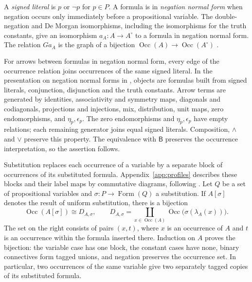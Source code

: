 \documentclass[11pt]{article}
\newcommand{\B}{\mathsf B}
\newcommand{\Occ}{\operatorname{Occ}}
\newcommand{\FormulaSet}{\operatorname{Form}}
\begin{document}
A \emph{signed literal} is $p$ or $\neg p$ for $p\in P$.
A formula is in \emph{negation normal form} when negation occurs only
immediately before a propositional variable. The double-negation and
De Morgan isomorphisms, including the isomorphisms for the truth
constants, give an isomorphism $a_A:A\to A^\circ$ to a formula in
negation normal form. The relation $Ga_A$ is the graph of a bijection
$\Occ(A)\to\Occ(A^\circ)$
\cite[\S14.1, pp.~313--315]{DP}.

For arrows between formulas in negation normal form, every edge of
the occurrence relation joins occurrences of the same signed literal.
In the presentation on negation normal forms in
\cite[\S14.2, pp.~318--321]{DP}, objects are formulas built from
signed literals, conjunction, disjunction and the truth constants.
Arrow terms are generated by identities, associativity and symmetry
maps, diagonals and codiagonals, projections and injections, mix,
distribution, unit maps, zero endomorphisms, and $\eta_p,\epsilon_p$.
The zero endomorphisms and $\eta_p,\epsilon_p$ have empty relations;
each remaining generator joins equal signed literals.
Composition, $\wedge$ and $\vee$ preserve this property.
The equivalence with $\B$ preserves the occurrence interpretation,
so the assertion follows.

Substitution replaces each occurrence of a variable by a separate
block of occurrences of its substituted formula.
Appendix~\ref{app:profiles} describes these blocks and their label maps
by commutative diagrams, following \cite[\S9]{Notation}.
Let $Q$ be a set of propositional variables and
$\sigma:P\to\FormulaSet(Q)$ a substitution. If $A[\sigma]$ denotes the
result of uniform substitution, there is a bijection
\begin{equation}
 \Occ(A[\sigma])\cong D_{A,\sigma},\qquad
 D_{A,\sigma}=\coprod_{x\in\Occ(A)}
                  \Occ\bigl(\sigma(\lambda_A(x))\bigr).
 \label{eq:occ-substitution}
\end{equation}
The set on the right consists of pairs $(x,t)$, where $x$ is an
occurrence of $A$ and $t$ is an occurrence within the formula inserted there.
Induction on $A$ proves the bijection: the variable case has one
block, the constant cases have none, binary connectives form tagged
unions, and negation preserves the occurrence set. In particular,
two occurrences of the same variable give two separately tagged
copies of its substituted formula.
\end{document}
